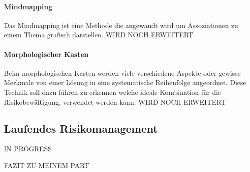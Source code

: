 \paragraph{Mindmapping}
Das Mindmapping ist eine Methode die angewandt wird um Assoziationen zu einem Thema grafisch darstellen.
WIRD NOCH ERWEITERT

\paragraph{Morphologischer Kasten}
Beim morphologischen Kasten werden viele verschiedene Aspekte oder gewisse Merkmale von einer Lösung in eine systematische Reihenfolge angeordnet. Diese Technik soll dazu führen zu erkennen welche ideale Kombination für die Risikobewältigung, verwendet werden kann.
WIRD NOCH ERWEITERT

\subsection{Laufendes Risikomanagement}
IN PROGRESS

FAZIT ZU MEINEM PART